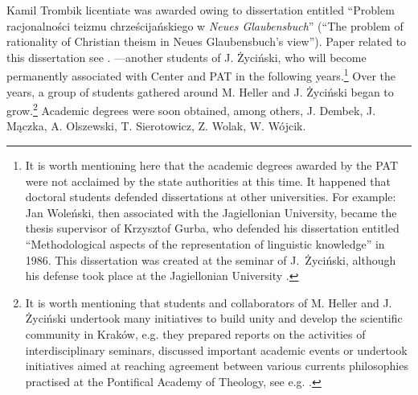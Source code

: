 \begin{artengenv}{Kamil Trombik}
{licentiate was awarded owing to dissertation entitled ``Problem racjonalności teizmu chrześcijańskiego w \textit{Neues
Glaubensbuch}'' (``The problem of rationality of Christian theism in Neues Glaubensbuch's view''). Paper related to this
dissertation see
\parencite{dadaczynski_poznanie_1984}.
}---another students of J. Życiński, who will become
permanently associated with Center and PAT in the following years.\footnote{It is worth mentioning here that the
academic degrees awarded by the PAT were not acclaimed by the state authorities at this time. It happened that doctoral
students defended dissertations at other universities. For example: Jan Woleński, then associated with the Jagiellonian
University, became the thesis supervisor of Krzysztof Gurba, who defended his dissertation entitled ``Methodological aspects of
the representation of linguistic knowledge'' in 1986. This dissertation was created at the seminar of J.~Życiński,
although his defense took place at the Jagiellonian University
\parencite{wolenski_interview_2017}.
} Over the
years, a group of students gathered around M. Heller and J. Życiński began to grow.\footnote{It is worth mentioning
that students and collaborators of M. Heller and J. Życiński undertook many initiatives to build unity and develop the
scientific community in Kraków, e.g. they prepared reports on the activities of interdisciplinary seminars, discussed
important academic events or undertook initiatives aimed at reaching agreement between various currents philosophies
practised at the Pontifical Academy of Theology, see e.g.
\parencite{michalik_wstep_1984,glodz_miedzynarodowe_1987,samborski_intuicjonizm_1987,liana_w_1989,%
	dembek_matematycznosc_1990,wolak_interdyscyplinarnosc_1992,samborski_na_1992,wolak_neotomizm_1993}.
} Academic
degrees were soon obtained, among others, J. Dembek, J. Mączka, A. Olszewski, T. Sierotowicz, Z. Wolak, W. Wójcik.


\end{artengenv}

